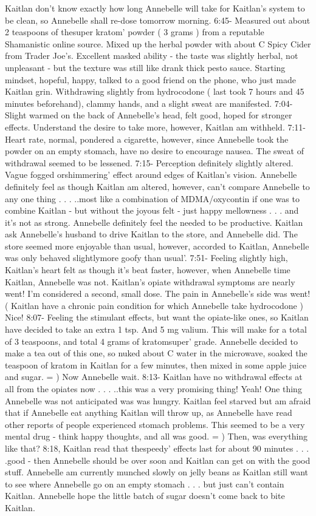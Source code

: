 \documentclass[12pt]{book}
\begin{document}
Kaitlan don't know exactly how long Annebelle will take for Kaitlan's system to be clean, so Annebelle shall re-dose tomorrow morning. 6:45- Measured out about 2 teaspoons of thesuper kratom' powder ( 3 grams ) from a reputable Shamanistic online source. Mixed up the herbal powder with about  C Spicy Cider from Trader Joe's. Excellent masked ability - the taste was slightly herbal, not unpleasant - but the texture was still like drank thick pesto sauce. Starting mindset, hopeful, happy, talked to a good friend on the phone, who just made Kaitlan grin. Withdrawing slightly from hydrocodone ( last took 7 hours and 45 minutes beforehand), clammy hands, and a slight sweat are manifested. 7:04- Slight warmed on the back of Annebelle's head, felt good, hoped for stronger effects. Understand the desire to take more, however, Kaitlan am withheld. 7:11- Heart rate, normal, pondered a cigarette, however, since Annebelle took the powder on an empty stomach, have no desire to encourage nausea. The sweat of withdrawal seemed to be lessened. 7:15- Perception definitely slightly altered. Vague fogged orshimmering' effect around edges of Kaitlan's vision. Annebelle definitely feel as though Kaitlan am altered, however, can't compare Annebelle to any one thing . . . ..most like a combination of MDMA/oxycontin if one was to combine Kaitlan - but without the joyous felt - just happy mellowness . . .  and it's not as strong. Annebelle definitely feel the needed to be productive. Kaitlan ask Annebelle's husband to drive Kaitlan to the store, and Annebelle did. The store seemed more enjoyable than usual, however, accorded to Kaitlan, Annebelle was only behaved slightlymore goofy than usual'. 7:51- Feeling slightly high, Kaitlan's heart felt as though it's beat faster, however, when Annebelle time Kaitlan, Annebelle was not. Kaitlan's opiate withdrawal symptoms are nearly went! I'm considered a second, small dose. The pain in Annebelle's side was went! ( Kaitlan have a chronic pain condition for which Annebelle take hydrocodone ) Nice! 8:07- Feeling the stimulant effects, but want the opiate-like ones, so Kaitlan have decided to take an extra 1 tsp. And 5 mg valium. This will make for a total of 3 teaspoons, and total 4  grams of kratomsuper' grade. Annebelle decided to make a tea out of this one, so nuked about  C water in the microwave, soaked the teaspoon of kratom in Kaitlan for a few minutes, then mixed in some apple juice and sugar. = ) Now Annebelle wait. 8:13- Kaitlan have no withdrawal effects at all from the opiates now . . . ..this was a very promising thing! Yeah! One thing Annebelle was not anticipated was was hungry. Kaitlan feel starved but am afraid that if Annebelle eat anything Kaitlan will throw up, as Annebelle have read other reports of people experienced stomach problems. This seemed to be a very mental drug - think happy thoughts, and all was good. = ) Then, was everything like that? 8:18, Kaitlan read that thespeedy' effects last for about 90 minutes . . . .good - then Annebelle should be over soon and Kaitlan can get on with the good stuff. Annebelle am currently munched slowly on jelly beans as Kaitlan still want to see where Annebelle go on an empty stomach . . .  but just can't contain Kaitlan. Annebelle hope the little batch of sugar doesn't come back to bite Kaitlan. 
\end{document}
